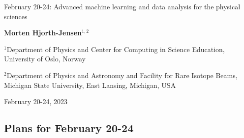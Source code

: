 \documentclass[%
oneside,                 %
final,                   %
10pt]{article}
\begin{document}

\newcommand{\exercisesection}[1]{\subsection*{#1}}






\thispagestyle{empty}

\begin{center}
{\LARGE\bf
\begin{spacing}{1.25}
February 20-24: Advanced machine learning and data analysis for the physical sciences
\end{spacing}
}
\end{center}


\begin{center}
{\bf Morten Hjorth-Jensen${}^{1, 2}$} \\ [0mm]
\end{center}

\begin{center}
\centerline{{\small ${}^1$Department of Physics and Center for Computing in Science Education, University of Oslo, Norway}}
\centerline{{\small ${}^2$Department of Physics and Astronomy and Facility for Rare Isotope Beams, Michigan State University, East Lansing, Michigan, USA}}
\end{center}
    

\begin{center}
February 20-24, 2023
\end{center}

\vspace{1cm}


\subsection{Plans for February 20-24}


\paragraph{}
\end{document}

